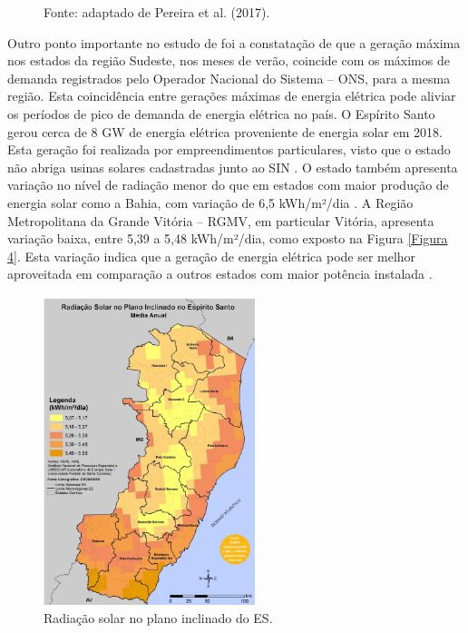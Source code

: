 \begin{onehalfspace}
\begin{figure}[ht]
        \begin{flushleft}
            \par \small Fonte: adaptado de Pereira et al. (2017).            
        \end{flushleft}
        \label{Figura 3}
    \end{figure}\vspace*{-0.4cm}

\noindent Outro ponto importante no estudo de \textcite{Pereira2017} foi a constatação de que a geração máxima nos estados da região Sudeste, nos meses de verão, coincide com os máximos de demanda registrados pelo Operador Nacional do Sistema – ONS, para a mesma região. Esta coincidência entre gerações máximas de energia elétrica pode aliviar os períodos de pico de demanda de energia elétrica no país.\vspace{0.3cm} \newline
\noindent O Espírito Santo gerou cerca de 8 GW de energia elétrica proveniente de energia solar em 2018. Esta geração foi realizada por empreendimentos particulares, visto que o estado não abriga usinas solares cadastradas junto ao SIN \cite{EmpresadePesquisaEnergetica-EPE2019a}. O estado também apresenta variação no nível de radiação menor do que em estados com maior produção de energia solar como a Bahia, com variação de 6,5 kWh/m²/dia \cite{AgenciadeServicosPublicosdeEnergiadoEstadodoEspiritoSanto-ASPE2013}.\vspace{0.3cm} \newline
A Região Metropolitana da Grande Vitória – RGMV, em particular Vitória, apresenta variação baixa, entre 5,39 a 5,48 kWh/m²/dia, como exposto na Figura \ref{Figura 4}. Esta variação indica que a geração de energia elétrica pode ser melhor aproveitada em comparação a outros estados com maior potência instalada \cite{AgenciadeServicosPublicosdeEnergiadoEstadodoEspiritoSanto-ASPE2013}.\vspace*{0.3cm}
    \begin{figure}[ht]
        \centering
        \caption{\small Radiação solar no plano inclinado do ES.}
        \includegraphics[width=0.55\textwidth]{figures/fig5-mapa3.jpg}

\end{figure}
\end{onehalfspace}
